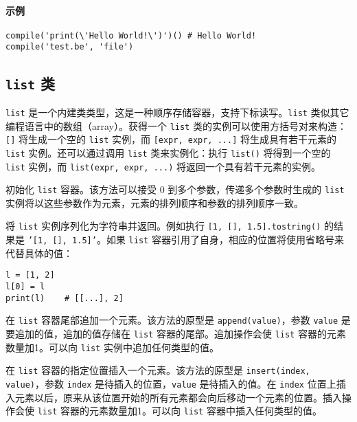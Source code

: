 \paragraph{示例}
\begin{lstlisting}[language=berry, numbers=none]
compile('print(\'Hello World!\')')() # Hello World!
compile('test.be', 'file')
\end{lstlisting}


\subsection{\texttt{list} 类}

\texttt{list} 是一个内建类类型，这是一种顺序存储容器，支持下标读写。\texttt{list} 类似其它编程语言中的数组（array）。获得一个 \texttt{list} 类的实例可以使用方括号对来构造：\texttt{[]} 将生成一个空的 \texttt{list} 实例，而 \texttt{[expr, expr, ...]} 将生成具有若干元素的 \texttt{list} 实例。还可以通过调用 \texttt{list} 类来实例化：执行 \texttt{list()} 将得到一个空的 \texttt{list} 实例，而 \texttt{list(expr, expr, ...)} 将返回一个具有若干元素的实例。


初始化 \texttt{list} 容器。该方法可以接受 0 到多个参数，传递多个参数时生成的 \texttt{list} 实例将以这些参数作为元素，元素的排列顺序和参数的排列顺序一致。


将 \texttt{list} 实例序列化为字符串并返回。例如执行 \texttt{[1, [], 1.5].tostring()} 的结果是 \texttt{'[1, [], 1.5]'}。如果 \texttt{list} 容器引用了自身，相应的位置将使用省略号来代替具体的值：
\begin{lstlisting}[language=berry, numbers=none]
l = [1, 2]
l[0] = l
print(l)    # [[...], 2]
\end{lstlisting}


在 \texttt{list} 容器尾部追加一个元素。该方法的原型是 \texttt{append(value)}，参数 \texttt{value} 是要追加的值，追加的值存储在 \texttt{list} 容器的尾部。追加操作会使 \texttt{list} 容器的元素数量加1。可以向 \texttt{list} 实例中追加任何类型的值。


在 \texttt{list} 容器的指定位置插入一个元素。该方法的原型是 \texttt{insert(index, value)}，参数 \texttt{index} 是待插入的位置，\texttt{value} 是待插入的值。在 \texttt{index} 位置上插入元素以后，原来从该位置开始的所有元素都会向后移动一个元素的位置。插入操作会使 \texttt{list} 容器的元素数量加1。可以向 \texttt{list} 容器中插入任何类型的值。

